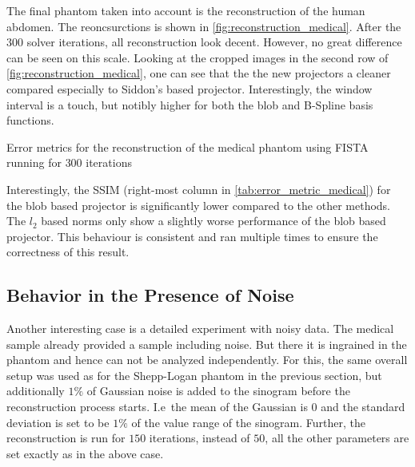 The final phantom taken into account is the reconstruction of the human abdomen. The reoncsurctions
is shown in \autoref{fig:reconstruction_medical}. After the \(300\) solver iterations, all
reconstruction look decent. However, no great difference can be seen on this scale. Looking at the
cropped images in the second row of \autoref{fig:reconstruction_medical}, one can see that the the
new projectors a cleaner compared especially to Siddon's based projector. Interestingly, the window
interval is a touch, but notibly higher for both the blob and B-Spline basis functions.

\begin{table}[h]%
	\centering
	\caption{Error metrics for the reconstruction of the medical phantom using FISTA running for
		\(300\) iterations}%
	\label{tab:error_metric_medical}
\end{table}

Interestingly, the \gls{SSIM} (right-most column in \autoref{tab:error_metric_medical}) for the blob
based projector is significantly lower compared to the other methods. The \(l_2\) based norms only
show a slightly worse performance of the blob based projector. This behaviour is consistent and ran
multiple times to ensure the correctness of this result.

\subsection{Behavior in the Presence of Noise}

Another interesting case is a detailed experiment with noisy data. The medical sample already
provided a sample including noise. But there it is ingrained in the phantom and hence can not be
analyzed independently. For this, the same overall setup was used as for the Shepp-Logan phantom in
the previous section, but additionally \(1\%\) of Gaussian noise is added to the sinogram before the
reconstruction process starts. I.e\ the mean of the Gaussian is \(0\) and the standard deviation is
set to be \(1\%\) of the value range of the sinogram. Further, the reconstruction is run for \(150\)
iterations, instead of \(50\), all the other parameters are set exactly as in the above case.

